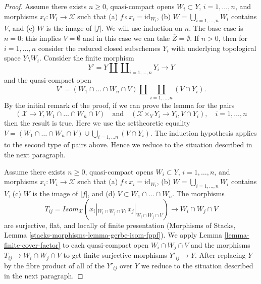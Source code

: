 \documentclass[10pt,a4paper]{amsart}
\theoremstyle{plain}
\theoremstyle{definition}
\theoremstyle{remark}
\numberwithin{equation}{subsection}
\begin{document}
\begin{proof}
\medskip\noindent
Assume there exists $n \geq 0$, quasi-compact opens
$W_i \subset Y$, $i = 1, \ldots, n$, and
morphisms $x_i : W_i \to \mathcal{X}$ such that
(a) $f \circ x_i = \text{id}_{W_i}$,
(b) $W = \bigcup_{i = 1, \ldots, n} W_i$ contains $V$, and
(c) $W$ is the image of $|f|$.
We will use induction on $n$. The base case is $n = 0$: this
implies $V = \emptyset$ and in this case we can take
$\overline{Z} = \emptyset$.
If $n > 0$, then for $i = 1, \ldots, n$
consider the reduced closed subschemes
$Y_i$ with underlying topological space
$Y \setminus W_i$. Consider the finite morphism
$$
Y' = Y \amalg \coprod\nolimits_{i = 1, \ldots, n} Y_i \longrightarrow Y
$$
and the quasi-compact open
$$
V' = (W_1 \cap \ldots \cap W_n \cap V) \amalg
\coprod_{i = 1, \ldots, n} (V \cap Y_i).
$$
By the initial remark of the proof, if we can prove the lemma for the pairs
$$
(\mathcal{X} \to Y, W_1 \cap \ldots \cap W_n \cap V)
\quad\text{and}\quad
(\mathcal{X} \times_Y Y_i \to Y_i, V \cap Y_i),\quad
i = 1, \ldots, n
$$
then the result is true. Here we use the settheoretic equality
$V = (W_1 \cap \ldots \cap W_n \cap V) \cup
\bigcup\nolimits_{i = 1, \ldots n} (V \cap Y_i)$.
The induction hypothesis applies to the second type of
pairs above. Hence we reduce to the situation described in
the next paragraph.

\medskip\noindent
Assume there exists $n \geq 0$, quasi-compact opens
$W_i \subset Y$, $i = 1, \ldots, n$, and
morphisms $x_i : W_i \to \mathcal{X}$ such that
(a) $f \circ x_i = \text{id}_{W_i}$,
(b) $W = \bigcup_{i = 1, \ldots, n} W_i$ contains $V$,
(c) $W$ is the image of $|f|$, and
(d) $V \subset W_1 \cap \ldots \cap W_n$.
The morphisms
$$
T_{ij} = \mathit{Isom}_\mathcal{X}(x_i|_{W_i \cap W_j \cap V},
x_j|_{W_i \cap W_j \cap V}) \longrightarrow W_i \cap W_j \cap V
$$
are surjective, flat, and locally of finite presentation
(Morphisms of Stacks, Lemma \ref{stacks-morphisms-lemma-gerbe-isom-fppf}).
We apply Lemma \ref{lemma-finite-cover-factor}
to each quasi-compact open $W_i \cap W_j \cap V$ and the morphisms
$T_{ij} \to W_i \cap W_j \cap V$ to get finite surjective morphisms
$Y'_{ij} \to Y$. After replacing $Y$ by the fibre product of all
of the $Y'_{ij}$ over $Y$ we reduce to the situation described
in the next paragraph.


\end{proof}
\end{document}

